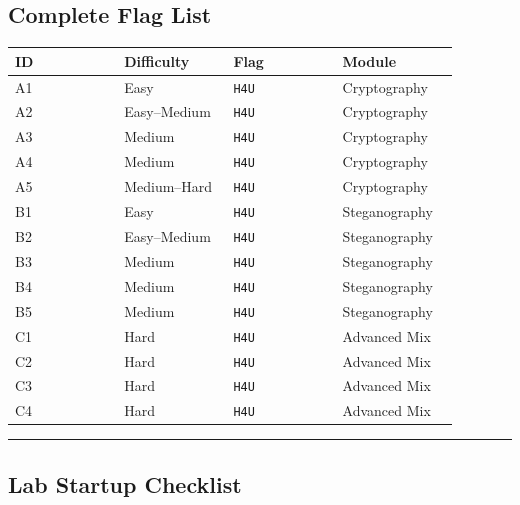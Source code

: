 \subsection{Complete Flag List}

{\footnotesize\begin{longtable}[]{@{}>{\raggedright\arraybackslash}p{0.22\linewidth}
  >{\raggedright\arraybackslash}p{0.22\linewidth}
  >{\raggedright\arraybackslash}p{0.22\linewidth}
  >{\raggedright\arraybackslash}p{0.22\linewidth}@{}}
\toprule\noalign{}
ID & Difficulty & Flag & Module \\
\midrule\noalign{}
\endhead
\bottomrule\noalign{}
\endlastfoot
A1 & Easy & \texttt{H4U} & Cryptography \\
A2 & Easy--Medium & \texttt{H4U} & Cryptography \\
A3 & Medium & \texttt{H4U} & Cryptography \\
A4 & Medium & \texttt{H4U} & Cryptography \\
A5 & Medium--Hard & \texttt{H4U} & Cryptography \\
B1 & Easy & \texttt{H4U} & Steganography \\
B2 & Easy--Medium & \texttt{H4U} & Steganography \\
B3 & Medium & \texttt{H4U} & Steganography \\
B4 & Medium & \texttt{H4U} & Steganography \\
B5 & Medium & \texttt{H4U} & Steganography \\
C1 & Hard & \texttt{H4U} & Advanced Mix \\
C2 & Hard & \texttt{H4U} & Advanced Mix \\
C3 & Hard & \texttt{H4U} & Advanced Mix \\
C4 & Hard & \texttt{H4U} & Advanced Mix \\
\end{longtable}}

\begin{center}\rule{0.5\linewidth}{0.5pt}\end{center}

\subsection{Lab Startup Checklist}


